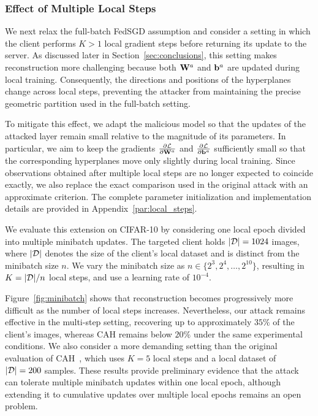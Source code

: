\subsubsection{Effect of Multiple Local Steps}\label{sec:local_steps_effect}

We next relax the full-batch FedSGD assumption and consider a setting in which the client performs $K>1$ local gradient steps before returning its update to the server. As discussed later in Section~\ref{sec:conclusions}, this setting makes reconstruction more challenging because both $\mathbf{W}^{a}$ and ${\mathbf{b}}^{a}$ are updated during local training. Consequently, the directions and positions of the hyperplanes change across local steps, preventing the attacker from maintaining the precise geometric partition used in the full-batch setting.

To mitigate this effect, we adapt the malicious model so that the updates of the attacked layer remain small relative to the magnitude of its parameters. In particular, we aim to keep the gradients $\frac{\partial \mathcal{L}}{\partial \mathbf{W}^{a}}$ and $\frac{\partial \mathcal{L}}{\partial {\mathbf{b}}^{a}}$ sufficiently small so that the corresponding hyperplanes move only slightly during local training. Since observations obtained after multiple local steps are no longer expected to coincide exactly, we also replace the exact comparison used in the original attack with an approximate criterion. The complete parameter initialization and implementation details are provided in Appendix~\ref{par:local_steps}.

We evaluate this extension on CIFAR-10 by considering one local epoch divided into multiple minibatch updates. The targeted client holds $|\mathcal{D}|=1024$ images, where $|\mathcal{D}|$ denotes the size of the client's local dataset and is distinct from the minibatch size $n$. We vary the minibatch size as $n\in\{2^3,2^4,\ldots,2^{10}\}$, resulting in $K=|\mathcal{D}|/n$ local steps, and use a learning rate of $10^{-4}$.

Figure~\ref{fig:minibatch} shows that reconstruction becomes progressively more difficult as the number of local steps increases. Nevertheless, our attack remains effective in the multi-step setting, recovering up to approximately $35\%$ of the client's images, whereas CAH remains below $20\%$ under the same experimental conditions. We also consider a more demanding setting than the original evaluation of CAH~\cite{boenischWhenCuriousAbandon2023}, which uses $K=5$ local steps and a local dataset of $|\mathcal{D}|=200$ samples. These results provide preliminary evidence that the attack can tolerate multiple minibatch updates within one local epoch, although extending it to cumulative updates over multiple local epochs remains an open problem.

